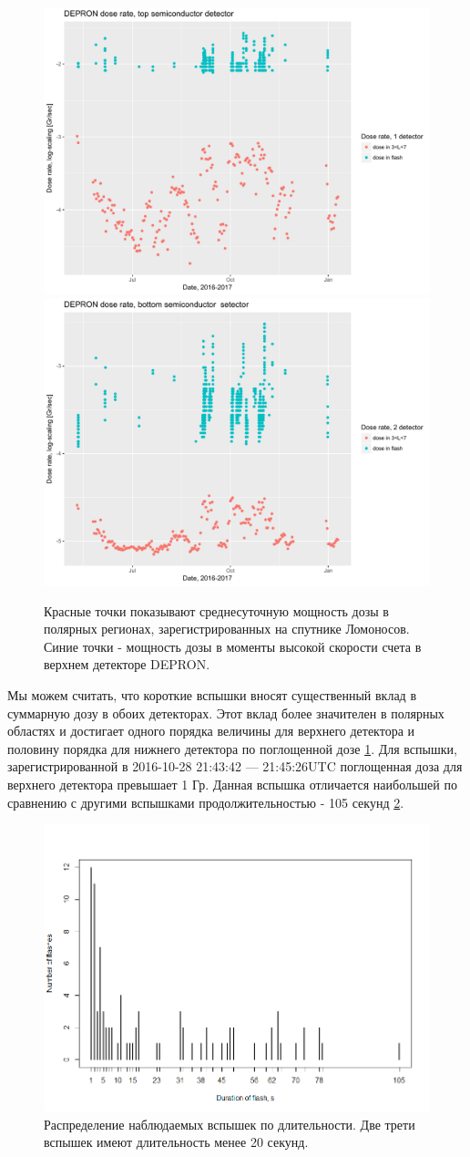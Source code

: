 \begin{figure}
	\centering
	\includegraphics[width=0.49\linewidth]{images/doseanalisys/flashdose1}
	\includegraphics[width=0.49\linewidth]{images/doseanalisys/flashdose2}
	\caption{Красные точки показывают среднесуточную мощность дозы в полярных регионах, зарегистрированных на спутнике Ломоносов. Синие точки - мощность дозы в моменты высокой скорости счета в верхнем детекторе DEPRON.}
	\label{fig:flashdose1}
\end{figure}
Мы можем считать, что короткие вспышки вносят существенный вклад в  суммарную дозу в обоих детекторах. Этот вклад более значителен в полярных областях и достигает одного порядка величины для верхнего детектора и половину порядка для нижнего детектора по поглощенной дозе \ref{fig:flashdose1}. Для вспышки, зарегистрированной в 2016-10-28 21:43:42 --- 21:45:26UTC поглощенная доза для верхнего детектора превышает 1 Гр. Данная вспышка отличается наибольшей по сравнению с другими вспышками продолжительностью - 105 секунд \ref{fig:rplot12}.

\begin{figure}
	\centering
	\includegraphics[width=0.7\linewidth]{images/Flash/Rplot12}
	\caption{Распределение наблюдаемых вспышек по длительности. Две трети вспышек имеют длительность менее 20 секунд.}
	\label{fig:rplot12}
\end{figure}




